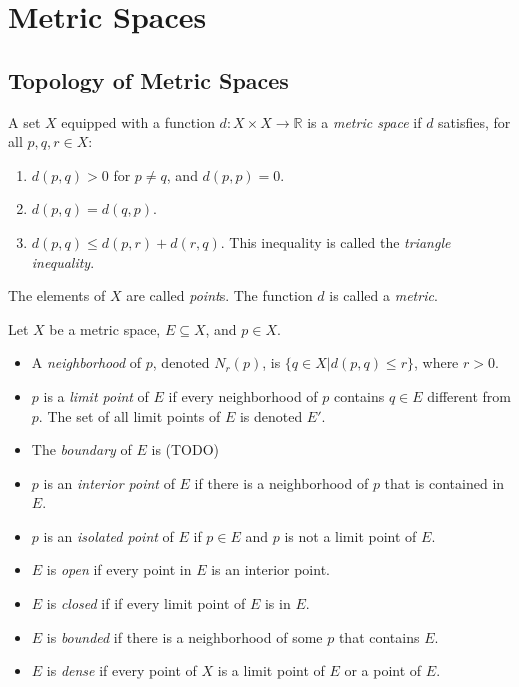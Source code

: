 

    \section{Metric Spaces}
    
    \subsection{Topology of Metric Spaces}
    
    \begin{defn} \label{def_metric_space}
        A set $X$ equipped with a function $d:X \times X \rightarrow \mathbb{R}$ is a \emph{metric space} if $d$ satisfies, for all $p,q,r \in X$:\begin{enumerate}
            \item $d(p,q)>0$ for $p \neq q$, and $d(p,p)=0$.
            \item $d(p,q)=d(q,p)$.
            \item $d(p,q) \leq d(p,r)+d(r,q)$. This inequality is called the \emph{triangle inequality}.
        \end{enumerate}
        The elements of $X$ are called \emph{point}s. The function $d$ is called a \emph{metric}.
    \end{defn}
    
    \begin{defn} \label{def_analysis_top}
        Let $X$ be a metric space, $E \subseteq X$, and $p \in X$. \begin{itemize}
            \item A \emph{neighborhood} of $p$, denoted $N_r(p)$, is $\{q \in X | d(p,q) \leq r \}$, where $r>0$.
            \item $p$ is a \emph{limit point} of $E$ if every neighborhood of $p$ contains $q \in E$ different from $p$. The set of all limit points of $E$ is denoted $E'$.
            \item The \emph{boundary} of $E$ is (TODO)
            \item $p$ is an \emph{interior point} of $E$ if there is a neighborhood of $p$ that is contained in $E$.
            \item $p$ is an \emph{isolated point} of $E$ if $p \in E$ and $p$ is not a limit point of $E$.
            \item $E$ is \emph{open} if every point in $E$ is an interior point.
            \item $E$ is \emph{closed} if if every limit point of $E$ is in $E$.
            \item $E$ is \emph{bounded} if there is a neighborhood of some $p$ that contains $E$.
            \item $E$ is \emph{dense} if every point of $X$ is a limit point of $E$ or a point of $E$.
        \end{itemize}
    \end{defn}
    

